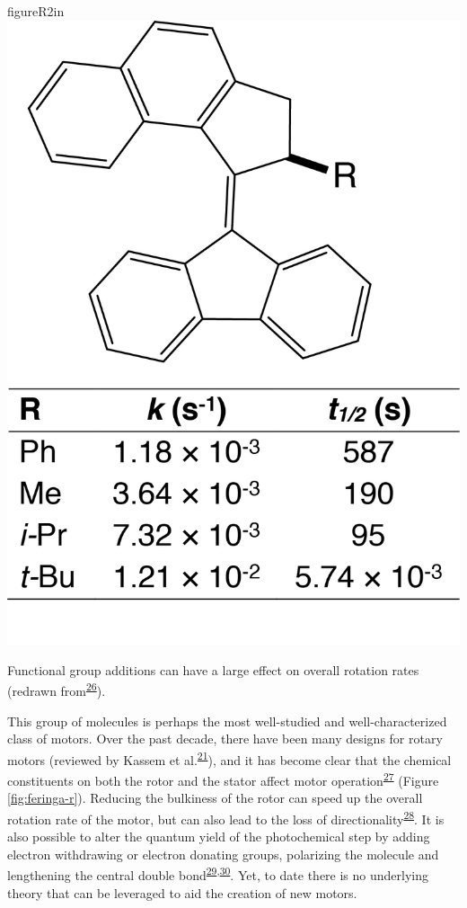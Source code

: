 \documentclass[11pt,notitlepage]{article}
\begin{document}
\begin{wrapfloat}{figure}{R}{2in}
\centering
\includegraphics{content/images/Feringa-R-with-table.png}
\caption{Functional group additions can have a large effect on overall
rotation rates (redrawn
from\textsuperscript{\protect\hyperlink{ref-gimGEnwq}{26}}).}
\label{fig:feringa-r}
\end{wrapfloat}

This group of molecules is perhaps the most well-studied and
well-characterized class of motors. Over the past decade, there have
been many designs for rotary motors (reviewed by Kassem et
al.\textsuperscript{\protect\hyperlink{ref-1H5r7SBir}{21}}), and it has
become clear that the chemical constituents on both the rotor and the
stator affect motor
operation\textsuperscript{\protect\hyperlink{ref-MVPWALSk}{27}} (Figure
\ref{fig:feringa-r}). Reducing the bulkiness of the rotor can speed up
the overall rotation rate of the motor, but can also lead to the loss of
directionality\textsuperscript{\protect\hyperlink{ref-1F5wsgY82}{28}}.
It is also possible to alter the quantum yield of the photochemical step
by adding electron withdrawing or electron donating groups, polarizing
the molecule and lengthening the central double
bond\textsuperscript{\protect\hyperlink{ref-Ewc7FKL8}{29},\protect\hyperlink{ref-122TltEto}{30}}.
Yet, to date there is no underlying theory that can be leveraged to aid
the creation of new motors.
\end{document}
